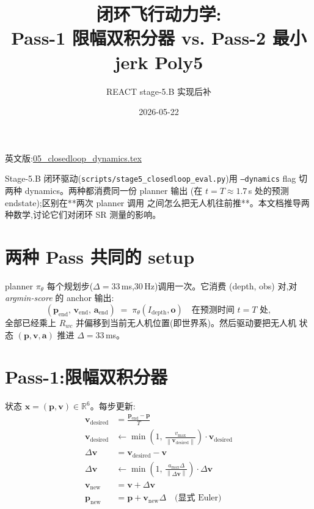 \documentclass[UTF8, 11pt]{ctexart}
\title{闭环飞行动力学:\\
       Pass-1 限幅双积分器 vs. Pass-2 最小 jerk Poly5}
\author{REACT stage-5.B 实现后补}
\date{2026-05-22}
\newcommand{\R}{\mathbb{R}}
\newcommand{\Norm}[1]{\left\lVert #1 \right\rVert}
\begin{document}
\maketitle

英文版:\href{run:./05_closedloop_dynamics.tex}{05\_closedloop\_dynamics.tex}

Stage-5.B 闭环驱动(\texttt{scripts/stage5\_closedloop\_eval.py})用
\texttt{--dynamics} flag 切两种 dynamics。两种都消费同一份 planner 输出
(在 $t = T \approx 1.7\,$s 处的预测 endstate);区别在**两次 planner 调用
之间怎么把无人机往前推**。本文档推导两种数学,讨论它们对闭环 SR 测量的影响。

\section{两种 Pass 共同的 setup}

planner $\pi_\theta$ 每个规划步($\Delta = 33\,$ms,30\,Hz)调用一次。它消费
(depth, obs) 对,对 \emph{argmin-score} 的 anchor 输出:
\begin{equation}\label{eq:planner-out}
(\bm{p}_{\text{end}},\, \bm{v}_{\text{end}},\, \bm{a}_{\text{end}}) \;=\; \pi_\theta(I_{\text{depth}}, \bm{o})
\quad\text{在预测时间 } t = T\text{ 处},
\end{equation}
全部已经乘上 $R_{wc}$ 并偏移到当前无人机位置(即世界系)。然后驱动要把无人机
状态 $(\bm{p}, \bm{v}, \bm{a})$ 推进 $\Delta = 33\,$ms。

\section{Pass-1:限幅双积分器}

状态 $\bm{x} = (\bm{p}, \bm{v}) \in \R^6$。每步更新:
\begin{align}
\bm{v}_{\text{desired}}      &= \frac{\bm{p}_{\text{end}} - \bm{p}}{T} \label{eq:vdes}\\
\bm{v}_{\text{desired}}      &\leftarrow \min\!\left(1,\,\frac{v_{\max}}{\Norm{\bm{v}_{\text{desired}}}}\right) \cdot \bm{v}_{\text{desired}}\\
\Delta\bm{v}                  &= \bm{v}_{\text{desired}} - \bm{v}\\
\Delta\bm{v}                  &\leftarrow \min\!\left(1,\,\frac{a_{\max}\Delta}{\Norm{\Delta\bm{v}}}\right) \cdot \Delta\bm{v}\\
\bm{v}_{\text{new}}           &= \bm{v} + \Delta\bm{v}\\
\bm{p}_{\text{new}}           &= \bm{p} + \bm{v}_{\text{new}}\Delta \quad\text{(显式 Euler)} \label{eq:p-euler}
\end{align}
\end{document}

